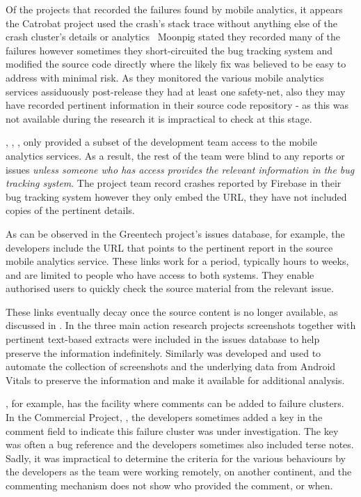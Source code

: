 Of the projects that recorded the failures found by mobile analytics, it appears the Catrobat project used the crash's stack trace without anything else of the crash cluster's details or analytics~ Moonpig stated they recorded many of the failures however sometimes they short-circuited the bug tracking system and modified the source code directly where the likely fix was believed to be easy to address with minimal risk. As they monitored the various mobile analytics services assiduously post-release they had at least one safety-net, also they may have recorded pertinent information in their source code repository - as this was not available during the research it is impractical to check at this stage.

, , , only provided a subset of the development team access to the mobile analytics services. As a result, the rest of the team were blind to any reports or issues \emph{unless someone who has access provides the relevant information in the bug tracking system}. The  project team record crashes reported by Firebase in their bug tracking system however they only embed the URL, they have not included copies of the pertinent details.

As can be observed in the Greentech project's issues database, for example, the developers include the URL that points to the pertinent report in the source mobile analytics service. These links work for a period, typically hours to weeks, and are limited to people who have access to both systems. They enable authorised users to quickly check the source material from the relevant issue. 

These links eventually decay once the source content is no longer available, as discussed in . In the three main action research projects screenshots together with pertinent text-based extracts were included in the issues database to help preserve the information indefinitely. Similarly  was developed and used to automate the collection of screenshots and the underlying data from Android Vitals to preserve the information and make it available for additional analysis.

, for example, has the facility where comments can be added to failure clusters. In the Commercial Project, , the developers sometimes added a key in the comment field to indicate this failure cluster was under investigation. The key was often a bug reference and the developers sometimes also included terse notes. Sadly, it was impractical to determine the criteria for the various behaviours by the developers as the team were working remotely, on another continent, and the commenting mechanism does not show who provided the comment, or when.

